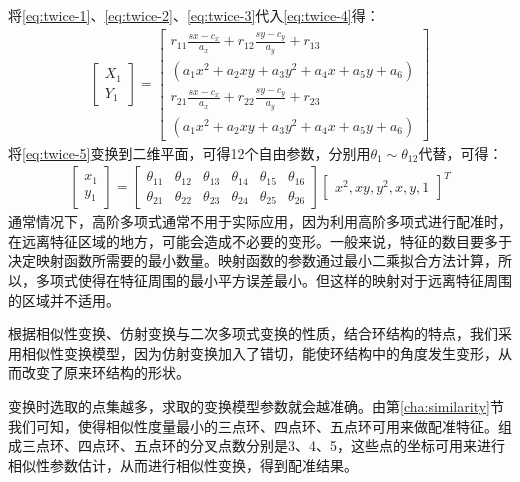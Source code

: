 \begin{enumerate}
将\ref{eq:twice-1}、\ref{eq:twice-2}、\ref{eq:twice-3}代入\ref{eq:twice-4}得：
\begin{align}
\left[ \begin{array}{c}
X_1 \\
Y_1
\end{array} \right]
=
\left[ \begin{array}{c}
r_{11}\frac{sx-c_x}{a_x} + r_{12}\frac{sy-c_y}{a_y} + r_{13} \\
(a_1x^2 + a_2xy + a_3y^2 + a_4x + a_5y + a_6)\\
r_{21}\frac{sx-c_x}{a_x} + r_{22}\frac{sy-c_y}{a_y} + r_{23}\\
(a_1x^2 + a_2xy + a_3y^2 + a_4x + a_5y + a_6)
\end{array} \right]
\label{eq:twice-5}
\end{align}
将\ref{eq:twice-5}变换到二维平面，可得12个自由参数，分别用$\theta_1 \sim \theta_{12}$代替，可得：
\begin{align}
\left[ \begin{array}{c}
x_1 \\
y_1
\end{array} \right]
=
\left[ \begin{array}{cccccc}
\theta_{11} & \theta_{12} & \theta_{13} & \theta_{14} & \theta_{15} & \theta_{16} \\
\theta_{21} & \theta_{22} & \theta_{23} & \theta_{24} & \theta_{25} & \theta_{26} 
\end{array} \right]
\left[ \begin{array}{c}
x^2, xy, y^2, x, y, 1
\end{array} \right]^T
\end{align}
通常情况下，高阶多项式通常不用于实际应用，因为利用高阶多项式进行配准时，在远离特征区域的地方，可能会造成不必要的变形。一般来说，特征的数目要多于决定映射函数所需要的最小数量。映射函数的参数通过最小二乘拟合方法计算，所以，多项式使得在特征周围的最小平方误差最小。但这样的映射对于远离特征周围的区域并不适用。
\end{enumerate}

根据相似性变换、仿射变换与二次多项式变换的性质，结合环结构的特点，我们采用相似性变换模型，因为仿射变换加入了错切，能使环结构中的角度发生变形，从而改变了原来环结构的形状。

变换时选取的点集越多，求取的变换模型参数就会越准确。由第\ref{cha:similarity}节我们可知，使得相似性度量最小的三点环、四点环、五点环可用来做配准特征。组成三点环、四点环、五点环的分叉点数分别是3、4、5，这些点的坐标可用来进行相似性参数估计，从而进行相似性变换，得到配准结果。

